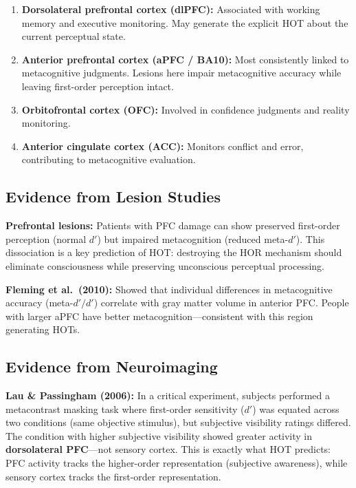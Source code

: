\documentclass[11pt,a4paper]{report}
\begin{document}
\begin{mechbox}
\begin{enumerate}[leftmargin=1.5em]
  \item \textbf{Dorsolateral prefrontal cortex (dlPFC):} Associated with working memory and executive monitoring. May generate the explicit HOT about the current perceptual state.
  \item \textbf{Anterior prefrontal cortex (aPFC / BA10):} Most consistently linked to metacognitive judgments. Lesions here impair metacognitive accuracy while leaving first-order perception intact.
  \item \textbf{Orbitofrontal cortex (OFC):} Involved in confidence judgments and reality monitoring.
  \item \textbf{Anterior cingulate cortex (ACC):} Monitors conflict and error, contributing to metacognitive evaluation.
\end{enumerate}
\end{mechbox}

\subsection{Evidence from Lesion Studies}

\textbf{Prefrontal lesions:} Patients with PFC damage can show preserved first-order perception (normal $d'$) but impaired metacognition (reduced meta-$d'$). This dissociation is a key prediction of HOT: destroying the HOR mechanism should eliminate consciousness while preserving unconscious perceptual processing.

\textbf{Fleming et al.\ (2010):} Showed that individual differences in metacognitive accuracy (meta-$d'/d'$) correlate with gray matter volume in anterior PFC. People with larger aPFC have better metacognition---consistent with this region generating HOTs.

\subsection{Evidence from Neuroimaging}

\textbf{Lau \& Passingham (2006):} In a critical experiment, subjects performed a metacontrast masking task where first-order sensitivity ($d'$) was equated across two conditions (same objective stimulus), but subjective visibility ratings differed. The condition with higher subjective visibility showed greater activity in \textbf{dorsolateral PFC}---not sensory cortex. This is exactly what HOT predicts: PFC activity tracks the higher-order representation (subjective awareness), while sensory cortex tracks the first-order representation.
\end{document}
